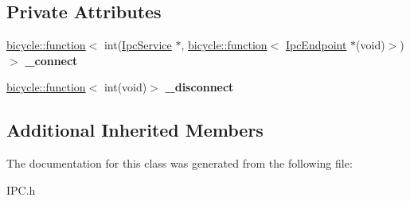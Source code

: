 \subsection*{Private Attributes}
\begin{DoxyCompactItemize}
\item 
\mbox{\label{class_ipc_client_block_a4fa3acdbbd1994afe795210ea85041d1}} 
\hyperlink{classbicycle_1_1function}{bicycle\+::function}$<$ int(\hyperlink{class_ipc_service}{Ipc\+Service} $\ast$, \hyperlink{classbicycle_1_1function}{bicycle\+::function}$<$ \hyperlink{class_ipc_endpoint}{Ipc\+Endpoint} $\ast$(void)$>$)$>$ {\bfseries \+\_\+connect}
\item 
\mbox{\label{class_ipc_client_block_a2e31f029c8aeecb086ac6e4a48df71fe}} 
\hyperlink{classbicycle_1_1function}{bicycle\+::function}$<$ int(void)$>$ {\bfseries \+\_\+disconnect}
\end{DoxyCompactItemize}
\subsection*{Additional Inherited Members}


The documentation for this class was generated from the following file\+:\begin{DoxyCompactItemize}
\item 
I\+P\+C.\+h\end{DoxyCompactItemize}

